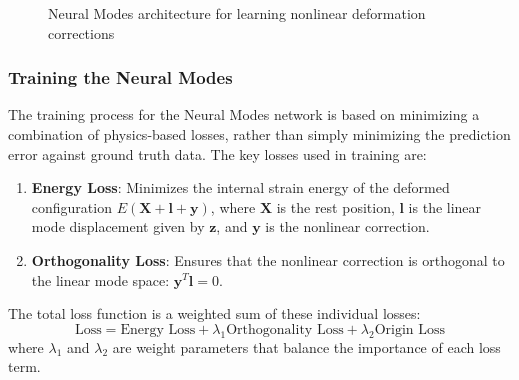 \begin{figure}
    \centering
    \caption{Neural Modes architecture for learning nonlinear deformation corrections}
    \label{fig:neural_modes_arch}
\end{figure}

\subsubsection{Training the Neural Modes}
The training process for the Neural Modes network is based on minimizing a combination of physics-based losses, rather than simply minimizing the prediction error against ground truth data. The key losses used in training are:

\begin{enumerate}
    \item \textbf{Energy Loss}: Minimizes the internal strain energy of the deformed configuration $E(\bm{X} + \bm{l} + \bm{y})$, where $\bm{X}$ is the rest position, $\bm{l}$ is the linear mode displacement given by $\bm{z}$, and $\bm{y}$ is the nonlinear correction.
    
    \item \textbf{Orthogonality Loss}: Ensures that the nonlinear correction is orthogonal to the linear mode space: $\bm{y}^T \bm{l} = 0$.
    
\end{enumerate}

The total loss function is a weighted sum of these individual losses:
\begin{equation}
    \text{Loss} = \text{Energy Loss} + \lambda_1 \text{Orthogonality Loss} + \lambda_2 \text{Origin Loss}
\end{equation}
where $\lambda_1$ and $\lambda_2$ are weight parameters that balance the importance of each loss term.

